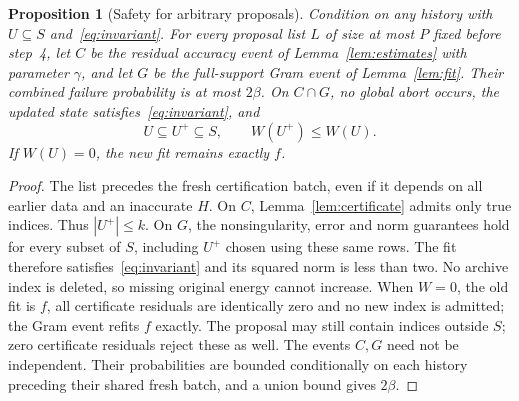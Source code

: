 \documentclass[11pt]{article}
\newtheorem{proposition}[theorem]{Proposition}
\theoremstyle{remark}\newtheorem{remark}[theorem]{Remark}
\begin{document}
\begin{proposition}[Safety for arbitrary proposals]\label{prop:safety}
Condition on any history with $U\subseteq S$ and~\eqref{eq:invariant}. For every proposal list $L$ of size at most $P$ fixed before step~4, let $C$ be the residual accuracy event of Lemma~\ref{lem:estimates} with parameter $\gamma$, and let $G$ be the full-support Gram event of Lemma~\ref{lem:fit}. Their combined failure probability is at most $2\beta$. On $C\cap G$, no global abort occurs, the updated state satisfies~\eqref{eq:invariant}, and
\[
 U\subseteq U^+\subseteq S,\qquad W(U^+)\le W(U).
\]
If $W(U)=0$, the new fit remains exactly $f$.
\end{proposition}
\begin{proof}
The list precedes the fresh certification batch, even if it depends on all earlier data and an inaccurate $H$. On $C$, Lemma~\ref{lem:certificate} admits only true indices. Thus $|U^+|\le k$. On $G$, the nonsingularity, error and norm guarantees hold for every subset of $S$, including $U^+$ chosen using these same rows. The fit therefore satisfies~\eqref{eq:invariant} and its squared norm is less than two. No archive index is deleted, so missing original energy cannot increase. When $W=0$, the old fit is $f$, all certificate residuals are identically zero and no new index is admitted; the Gram event refits $f$ exactly. The proposal may still contain indices outside $S$; zero certificate residuals reject these as well. The events $C,G$ need not be independent. Their probabilities are bounded conditionally on each history preceding their shared fresh batch, and a union bound gives $2\beta$.
\end{proof}
\end{document}
